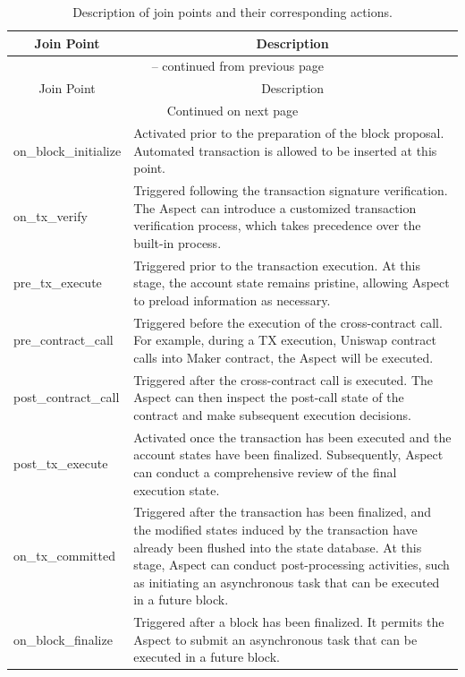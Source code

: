 \begin{longtable}{p{4cm}p{10cm}} %
    \caption{Description of join points and their corresponding actions.}
    \label{tab:join-points-table} %
    \\
    \toprule
    \multicolumn{1}{c}{Join Point} & \multicolumn{1}{c}{Description} \\
    \midrule
    \endfirsthead
    
    \multicolumn{2}{c}{{\tablename\ \thetable{} -- continued from previous page}} \\
    \midrule
    \multicolumn{1}{c}{Join Point} & \multicolumn{1}{c}{Description} \\
    \midrule
    \endhead
    
    \midrule
    \multicolumn{2}{c}{{Continued on next page}} \\
    \endfoot
    
    \bottomrule
    \endlastfoot
    
    on\_block\_initialize & Activated prior to the preparation of the block proposal. Automated transaction is allowed to be inserted at this point. \\[20pt]
    on\_tx\_verify & Triggered following the transaction signature verification. The Aspect can introduce a customized transaction verification process, which takes precedence over the built-in process. \\[30pt]
    pre\_tx\_execute & Triggered prior to the transaction execution. At this stage, the account state remains pristine, allowing Aspect to preload information as necessary. \\[30pt]
    pre\_contract\_call & Triggered before the execution of the cross-contract call. For example, during a TX execution, Uniswap contract calls into Maker contract, the Aspect will be executed. \\[30pt]
    post\_contract\_call & Triggered after the cross-contract call is executed. The Aspect can then inspect the post-call state of the contract and make subsequent execution decisions. \\[30pt]
    post\_tx\_execute & Activated once the transaction has been executed and the account states have been finalized. Subsequently, Aspect can conduct a comprehensive review of the final execution state. \\[30pt]
    on\_tx\_committed & Triggered after the transaction has been finalized, and the modified states induced by the transaction have already been flushed into the state database. At this stage, Aspect can conduct post-processing activities, such as initiating an asynchronous task that can be executed in a future block. \\[60pt]
    on\_block\_finalize & Triggered after a block has been finalized. It permits the Aspect to submit an asynchronous task that can be executed in a future block. \\[30pt]
\end{longtable}


